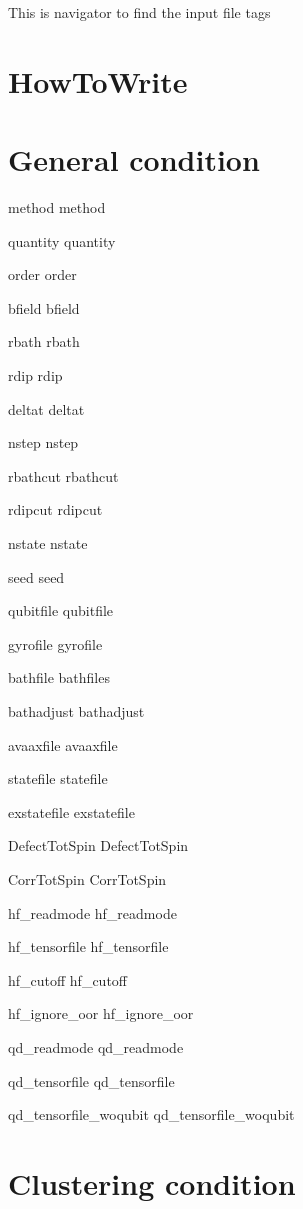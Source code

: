 This is navigator to find the input file tags\hypertarget{InputFile_HowToWrite}{}\section{How\-To\-Write}\label{InputFile_HowToWrite}
\hypertarget{InputFile_Config_CONFIG}{}\section{General condition}\label{InputFile_Config_CONFIG}

\begin{DoxyItemize}
\item method method
\item quantity quantity
\item order order
\item bfield bfield
\item rbath rbath
\item rdip rdip
\item deltat deltat
\item nstep nstep
\item rbathcut rbathcut
\item rdipcut rdipcut
\item nstate nstate
\item seed seed
\item qubitfile qubitfile
\item gyrofile gyrofile
\item bathfile bathfiles
\item bathadjust bathadjust
\item avaaxfile avaaxfile
\item statefile statefile
\item exstatefile exstatefile
\item Defect\-Tot\-Spin Defect\-Tot\-Spin
\item Corr\-Tot\-Spin Corr\-Tot\-Spin
\item hf\-\_\-readmode hf\-\_\-readmode
\item hf\-\_\-tensorfile hf\-\_\-tensorfile
\item hf\-\_\-cutoff hf\-\_\-cutoff
\item hf\-\_\-ignore\-\_\-oor hf\-\_\-ignore\-\_\-oor
\item qd\-\_\-readmode qd\-\_\-readmode
\item qd\-\_\-tensorfile qd\-\_\-tensorfile
\item qd\-\_\-tensorfile\-\_\-woqubit qd\-\_\-tensorfile\-\_\-woqubit
\end{DoxyItemize}\hypertarget{InputFile_Config_CLUSTER}{}\section{Clustering condition}\label{InputFile_Config_CLUSTER}

